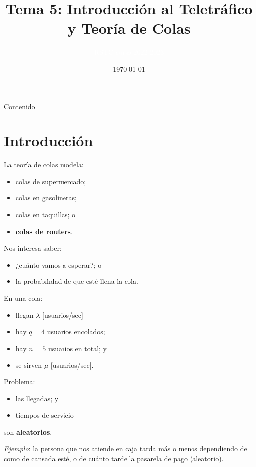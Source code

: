 \documentclass[xcolor={x11names}]{beamer}
\title[Tema 5]{Tema 5: Introducción al Teletráfico y Teoría de Colas}
\author{\textcolor{white}{RSTC curso 2022-2023}}
\date{\today}
\begin{document}
\frame{\titlepage }


\begin{frame}{Contenido}
    \tableofcontents
\end{frame}




\section{Introducción}
\begin{frame}{\secname}
    La teoría de colas modela:
    \begin{itemize}
        \item colas de supermercado;
        \item colas en gasolineras;
        \item colas en taquillas; o
        \item \textbf{colas de routers}.
    \end{itemize}

    \vfill
    Nos interesa saber:
    \begin{itemize}
        \item ¿cuánto vamos a esperar?; o
        \item la probabilidad de que esté llena la cola.
    \end{itemize}
\end{frame}



\begin{frame}{\secname}
    \begin{figure}
        
    \end{figure}

    En una cola:
    \begin{itemize}
        \item llegan $\lambda$ [usuarios/sec]
        \item hay $q=4$ usuarios encolados;
        \item hay $n=5$ usuarios en total; y
        \item se sirven $\mu$ [usuarios/sec].
    \end{itemize}
\end{frame}


\begin{frame}{\secname}
    Problema:
    \begin{itemize}
        \item las llegadas; y
        \item tiempos de servicio
    \end{itemize}
    son \textbf{aleatorios}.

    \vfill

    \textit{Ejemplo}: la persona que nos
    atiende en caja tarda más o menos
    dependiendo de como de cansada esté,
    o de cuánto tarde la pasarela de pago
    (aleatorio).
\end{frame}
\end{document}
